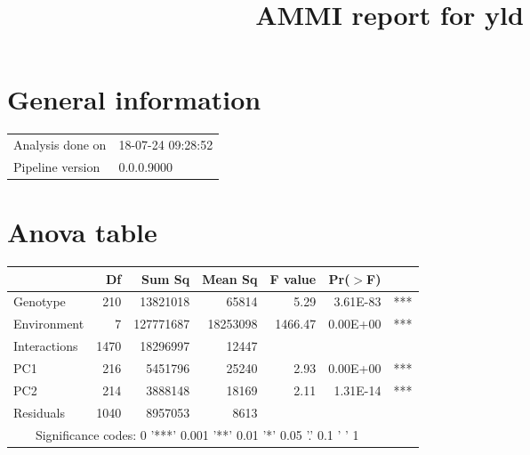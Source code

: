 \documentclass[a4paper,11pt]{article}\usepackage[]{graphicx}\usepackage[]{color}
\title{AMMI report for yld}%
\author{\vspace{-5ex}}
\date{\vspace{-5ex}}
\begin{document}
\maketitle
\singlespacing

\section{General information}
\begin{table}[ht]
\begin{flushleft}
\begin{tabular}{ll}
  Analysis done on & 18-07-24 09:28:52 \\ 
  Pipeline version & 0.0.0.9000 \\ 
  \end{tabular}
\label{general}
\end{flushleft}
\end{table}


\section{Anova table}

\begin{table}[ht]
\begin{flushleft}
\begin{tabular}{lrrrrrl}
  \hline
 & Df & Sum Sq & Mean Sq & F value & Pr($>$F) &  \\ 
  \hline
Genotype & 210 & 13821018 & 65814 & 5.29 & 3.61E-83 & *** \\ 
  Environment & 7 & 127771687 & 18253098 & 1466.47 & 0.00E+00 & *** \\ 
  Interactions & 1470 & 18296997 & 12447 &  &  &  \\ 
  PC1 & 216 & 5451796 & 25240 & 2.93 & 0.00E+00 & *** \\ 
  PC2 & 214 & 3888148 & 18169 & 2.11 & 1.31E-14 & *** \\ 
  Residuals & 1040 & 8957053 & 8613 &  &  &  \\ 
   \hline  \multicolumn{6}{c}{Significance codes:  0 '***' 0.001 '**' 0.01 '*' 0.05 '.' 0.1 ' ' 1} \\ \hline
\end{tabular}
\label{anova}
\end{flushleft}
\end{table}
\end{document}
